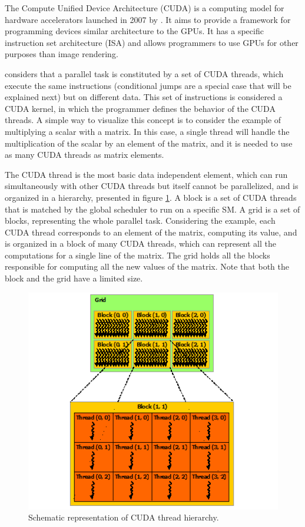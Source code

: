 The Compute Unified Device Architecture (CUDA) is a computing model for hardware accelerators launched in 2007 by \nvidia. It aims to provide a framework for programming devices similar architecture to the \nvidia GPUs. It has a specific instruction set architecture (ISA) and allows programmers to use GPUs for other purposes than image rendering.

\nvidia considers that a parallel task is constituted by a set of CUDA threads, which execute the same instructions (conditional jumps are a special case that will be explained next) but on different data. This set of instructions is considered a CUDA kernel, in which the programmer defines the behavior of the CUDA threads. A simple way to visualize this concept is to consider the example of multiplying a scalar with a matrix. In this case, a single thread will handle the multiplication of the scalar by an element of the matrix, and it is needed to use as many CUDA threads as matrix elements.

The CUDA thread is the most basic data independent element, which can run simultaneously with other CUDA threads but itself cannot be parallelized, and is organized in a hierarchy, presented in figure \ref{fig:CUDAHierarchy}. A block is a set of CUDA threads that is matched by the global scheduler to run on a specific SM. A grid is a set of blocks, representing the whole parallel task. Considering the example, each CUDA thread corresponds to an element of the matrix, computing its value, and is organized in a block of many CUDA threads, which can represent all the computations for a single line of the matrix. The grid holds all the blocks responsible for computing all the new values of the matrix. Note that both the block and the grid have a limited size.

\begin{figure}[!htp]
	\begin{center}
		\includegraphics[scale=0.7]{../../common/img/cuda_hierarchy.png}
		\caption{Schematic representation of CUDA thread hierarchy.}
		\label{fig:CUDAHierarchy}
	\end{center}
\end{figure}

